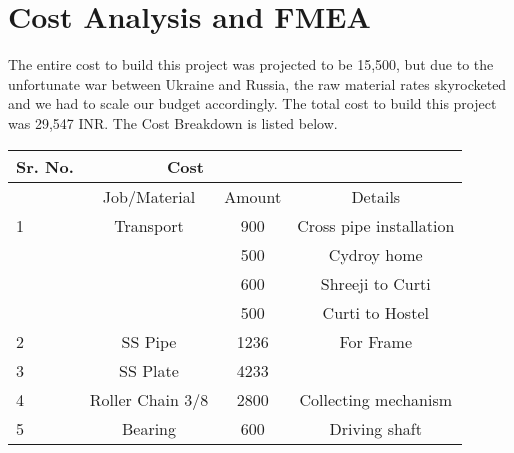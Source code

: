 \chapter{Cost Analysis and FMEA} \label{Cost Analysis and FMEA}

The entire cost to build this project was projected to be 15,500, but due to the unfortunate war between Ukraine and Russia, the raw material rates skyrocketed and we had to scale our budget accordingly. The total cost to build this project was 29,547 INR. The Cost Breakdown is listed below.

\begin{table}[!ht]
\centering
\begin{tabular}{|l|cc|c|}
\hline
\multicolumn{1}{|c|}{Sr. No.} & \multicolumn{2}{c|}{Cost}                                    & \multicolumn{1}{l|}{}      \\ \hline
                              & \multicolumn{1}{c|}{Job/Material}                   & Amount & Details                    \\ \hline
\multirow{}{}{1}            & \multicolumn{1}{c|}{\multirow{}{}{Transport}}     & 900    & Cross pipe installation    \\ \cline{3-4} 
                              & \multicolumn{1}{c|}{}                               & 500    & Cydroy home                \\ \cline{3-4} 
                              & \multicolumn{1}{c|}{}                               & 600    & Shreeji to Curti           \\ \cline{3-4} 
                              & \multicolumn{1}{c|}{}                               & 500    & Curti to Hostel            \\ \hline
2                             & \multicolumn{1}{c|}{SS Pipe}                        & 1236   & \multirow{}{}{For Frame} \\ \cline{1-3}
3                             & \multicolumn{1}{c|}{SS Plate}                       & 4233   &                            \\ \hline
4                             & \multicolumn{1}{c|}{Roller Chain 3/8}               & 2800   & Collecting mechanism       \\ \hline
\multirow{}{}{5}            & \multicolumn{1}{c|}{\multirow{}{}{Bearing}}       & 600    & Driving shaft              \\ \cline{3-4} 

\end{tabular}
\end{table}
